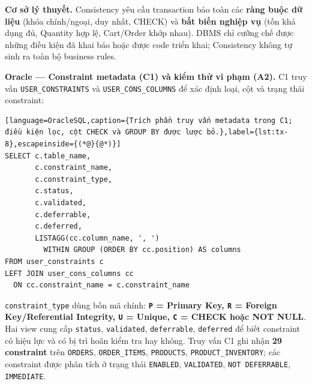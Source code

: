 \label{sec:tx-2-2}
\textbf{Cơ sở lý thuyết.} Consistency yêu cầu transaction bảo toàn các \textbf{ràng buộc dữ liệu} (khóa chính/ngoại, duy nhất, CHECK) và \textbf{bất biến nghiệp vụ} (tồn khả dụng đủ, Quantity hợp lệ, Cart/Order khớp nhau). DBMS chỉ cưỡng chế được những điều kiện đã khai báo hoặc được code triển khai; Consistency không tự sinh ra toàn bộ business rules.

\textbf{Oracle — Constraint metadata (C1) và kiểm thử vi phạm (A2).} C1 truy vấn \texttt{USER\_\allowbreak{}CONSTRAINTS} và \texttt{USER\_\allowbreak{}CONS\_\allowbreak{}COLUMNS} để xác định loại, cột và trạng thái constraint:

\begin{lstlisting}[language=OracleSQL,caption={Trích phần truy vấn metadata trong C1; điều kiện lọc, cột CHECK và GROUP BY được lược bỏ.},label={lst:tx-8},escapeinside={(*@}{@*)}]
SELECT c.table_name,
       c.constraint_name,
       c.constraint_type,
       c.status,
       c.validated,
       c.deferrable,
       c.deferred,
       LISTAGG(cc.column_name, ', ')
         WITHIN GROUP (ORDER BY cc.position) AS columns
FROM user_constraints c
LEFT JOIN user_cons_columns cc
  ON cc.constraint_name = c.constraint_name
\end{lstlisting}

\texttt{constraint\_\allowbreak{}type} dùng bốn mã chính: \textbf{\texttt{P} = Primary Key, \texttt{R} = Foreign Key/Referential Integrity, \texttt{U} = Unique, \texttt{C} = CHECK hoặc NOT NULL}. Hai view cung cấp \texttt{status}, \texttt{validated}, \texttt{deferrable}, \texttt{deferred} để biết constraint có hiệu lực và có bị trì hoãn kiểm tra hay không. Truy vấn C1 ghi nhận \textbf{29 constraint} trên \texttt{ORDERS}, \texttt{ORDER\_\allowbreak{}ITEMS}, \texttt{PRODUCTS}, \texttt{PRODUCT\_\allowbreak{}INVENTORY}; các constraint được phân tích ở trạng thái \texttt{ENABLED}, \texttt{VALIDATED}, \texttt{NOT DEFERRABLE}, \texttt{IMMEDIATE}.

